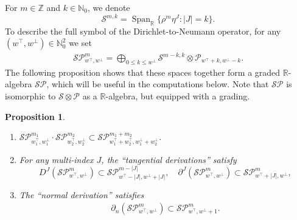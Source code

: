 \documentclass[11pt]{amsart}
\newcommand{\Span}{\operatorname{Span}}
\newtheorem{proposition}[theorem]{Proposition}
\theoremstyle{definition}
\numberwithin{equation}{section}
\begin{document}
For $m\in\mathbb Z$ and $k \in \mathbb N_0$, we denote
\[\mathcal S^{m,k}   = \Span_\mathbb R\{\rho^m\eta^J\colon|J| = k\}.\]
To describe the full symbol of the Dirichlet-to-Neumann operator, for any   $(w^\top,w^\bot)\in\mathbb N_0^2$ we set
\begin{align*} 
    \mathcal S\mathcal P_{w^\top,w^\bot}^m   = \bigoplus_{0\le k\le w^\bot}\mathcal S^{m-k,k}\otimes\mathcal P_{w^\top + k,w^\bot - k}.
\end{align*}
The following proposition shows that these spaces together form a graded $\mathbb R$-algebra $\mathcal{SP}$, which will be useful in the computations below. Note that $\mathcal {SP}$ is isomorphic to $\mathcal S\otimes\mathcal P$ as a $\mathbb R$-algebra, but equipped with a grading.
\begin{proposition}\label{prop:thespaceSP}
	\begin{enumerate}
		\item $\mathcal{SP}_{w_1^\top,w_1^\bot}^{m_1}\cdot\mathcal{SP}_{w_2^\top,w_2^\bot}^{m_2}\subset\mathcal{SP}_{w_1^\top+w_2^\top,w_1^\bot+w_2^\bot}^{m_1+m_2}$.
		\item For any multi-index $J$, the ``tangential derivations” satisfy 
		\begin{equation*}
			D^J(\mathcal{SP}_{w^\top,w^\bot}^m) \subset \mathcal{SP}_{w^\top-|J|,w^\bot+|J|}^{m-|J|},\quad \partial^J(\mathcal{SP}_{w^\top,w^\bot}^m) \subset \mathcal{SP}_{w^\top+|J|, w^\bot}^m,
		\end{equation*}
		\item The ``normal derivation” satisfies   
		\begin{align*}%
			\partial_n(\mathcal{SP}_{w^\top,w^\bot}^m) \subset \mathcal{SP}_{w^\top,w^\bot+1}^m.
		\end{align*}
	\end{enumerate}
\end{proposition}
\end{document}
